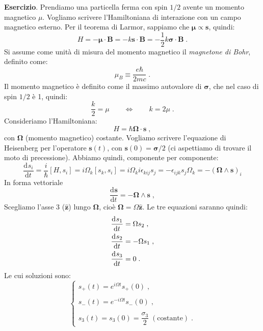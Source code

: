 \documentclass[10pt,a4paper]{report}
\theoremstyle{definition}
\newcommand{\dev}[3][]{\frac{\mathrm{d}^{#1} #2}{\mathrm{d} #3^{#1}}}
\numberwithin{equation}{section}
\begin{document}
\textbf{Esercizio}. Prendiamo una particella ferma con spin $1/2$ avente un momento magnetico $\mu$. Vogliamo scrivere l'Hamiltoniana di interazione con un campo magnetico esterno. Per il teorema di Larmor, sappiamo che $\boldsymbol{\mu}\propto \mathbf{s}$, quindi:
\begin{equation}
H=-\boldsymbol{\mu}\cdot\mathbf{B}=-k\mathbf{s}\cdot\mathbf{B}=-\frac{1}{2}k\boldsymbol{\sigma}\cdot\mathbf{B}\;.
\end{equation}
Si assume come unità di misura del momento magnetico il \textit{magnetone di Bohr}, definito come:
\begin{equation}
\mu_B\equiv \frac{e\hbar}{2mc}\;.
\end{equation}
Il momento magnetico è definito come il massimo autovalore di $\boldsymbol{\sigma}$, che nel caso di spin $1/2$ è 1, quindi:
\begin{equation}
\frac{k}{2}=\mu \qquad \Longleftrightarrow \qquad k=2\mu\;.
\end{equation}
Consideriamo l'Hamiltoniana:
\begin{equation}
H=\hbar \boldsymbol{\Omega}\cdot \mathbf{s}\;,
\end{equation}
con $\boldsymbol{\Omega}$ (momento magnetico) costante. Vogliamo scrivere l'equazione di Heisenberg per l'operatore $\mathbf{s}(t)$, con $\mathbf{s}(0)=\boldsymbol{\sigma}/2$ (ci aspettiamo di trovare il moto di precessione). Abbiamo quindi, componente per componente:
\begin{equation}
\dev{s_i}{t}=\frac{i}{\hbar}[H,s_i]=i\Omega_k[s_k,s_i]=i\Omega_k i\epsilon_{kij}s_j=-\epsilon_{ijk}s_j\Omega_k=-(\boldsymbol{\Omega}\wedge\mathbf{s})_i
\end{equation}
In forma vettoriale
\begin{equation}
\dev{\mathbf{s}}{t}=-\boldsymbol{\Omega}\wedge\mathbf{s}\;,
\end{equation}
Scegliamo l'asse 3 ($\hat{\mathbf{z}}$) lungo $\boldsymbol{\Omega}$, cioè $\boldsymbol{\Omega}=\Omega\hat{\mathbf{z}}$. Le tre equazioni saranno quindi:
\begin{align}
\dev{s_1}{t} &= \Omega s_2\;, \notag \\
\dev{s_2}{t} &= -\Omega s_1\;, \notag \\
\dev{s_3}{t} &= 0\;.
\end{align}
Le cui soluzioni sono:
\begin{equation}
\begin{cases}
s_+(t)=e^{i\Omega t}s_+(0)\;, \\
\\
s_-(t)=e^{-i\Omega t}s_-(0)\;, \\
\\
s_3(t)=s_3(0)=\dfrac{\sigma_3}{2}\; (\mbox{costante})\;.
\end{cases}
\end{equation}
\end{document}
